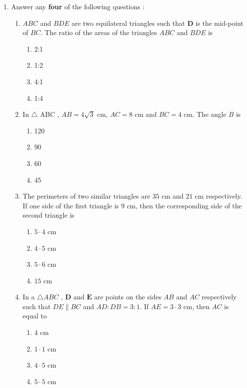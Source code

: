 \documentclass{article}
\let\vec\mathbf
\begin{document}
\begin{enumerate}
        \item Answer any \textbf{four} of the following questions :
        \begin{enumerate}[label=(\roman*)]
        \item $ABC$ and $BDE$ are two equilateral triangles such that $\vec{D}$ is the mid-point of $BC$. The ratio of the areas of the triangles $ABC$ and $BDE$ is
        \begin{enumerate}[label=(\Alph*)]
            \item 2:1
            \item 1:2
            \item 4:1
            \item 1:4
        \end{enumerate}
        
        \item In $\triangle$ ABC , $AB=4\sqrt{3}$ cm, $AC=8$ cm and $BC=4$ cm. The angle $B$ is

        \begin{enumerate}[label=(\Alph*)]
            \item 120\textdegree
            \item 90\textdegree
            \item 60\textdegree
            \item 45\textdegree
        \end{enumerate}
         
        \item The perimeters of two similar triangles are $35$ cm and $21$ cm respectively.  If one side of the first triangle is $9$ cm, then the corresponding side of the second triangle is 
        
         \begin{enumerate}[label=(\Alph*)]
            \item $5\cdot4$ cm
            \item $4\cdot5$ cm
            \item $5\cdot6$ cm
            \item $15$ cm
        \end{enumerate}
        
        \item In a $\triangle ABC$ , $\vec{D}$ and $\vec{E}$ are points on the sides $AB$ and $AC$ respectively such that $DE\parallel BC$ and $AD:DB=3:1$. If $AE=3\cdot3 $ cm, then $AC$ is equal to
        \begin{enumerate}[label=(\Alph*)]
            \item $4$ cm
            \item $1\cdot1$ cm
            \item $4\cdot5$ cm
            \item $5\cdot5$ cm
        \end{enumerate}
        

\end{enumerate}
\end{enumerate}
\end{document}
